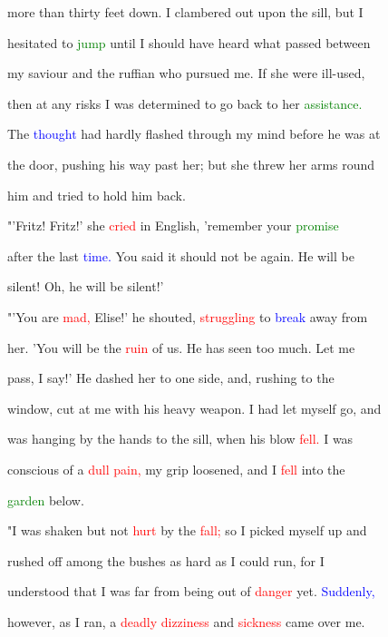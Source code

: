  more than thirty feet down. I clambered out upon the sill, but I

 hesitated to \textcolor{green}{jump} until I should have heard what passed between

 my saviour and the ruffian who pursued me. If she were ill-used,

 then at any \textcolor{BurntOrange}{risks} I was determined to go back to her \textcolor{green}{assistance.}

 The \textcolor{blue}{thought} had hardly flashed through my mind before he was at

 the door, pushing his way past her; but she threw her arms round

 him and tried to hold him back.



 "'Fritz! Fritz!' she \textcolor{red}{cried} in English, 'remember your \textcolor{green}{promise}

 after the last \textcolor{blue}{time.} You said it should not be again. He will be

 silent! Oh, he will be silent!'



 "'You are \textcolor{red}{mad,} Elise!' he \textcolor{BurntOrange}{shouted,} \textcolor{red}{struggling} to \textcolor{blue}{break} away from

 her. 'You will be the \textcolor{red}{ruin} of us. He has seen too much. Let me

 pass, I say!' He dashed her to one side, and, rushing to the

 window, cut at me with his heavy weapon. I had let myself go, and

 was hanging by the hands to the sill, when his blow \textcolor{red}{fell.} I was

 conscious of a \textcolor{red}{dull} \textcolor{red}{pain,} my grip loosened, and I \textcolor{red}{fell} into the

 \textcolor{green}{garden} below.



 "I was shaken but not \textcolor{red}{hurt} by the \textcolor{red}{fall;} so I picked myself up and

 rushed off among the bushes as hard as I could run, for I

 understood that I was far from being out of \textcolor{red}{danger} yet. \textcolor{blue}{Suddenly,}

 however, as I ran, a \textcolor{red}{deadly} \textcolor{red}{dizziness} and \textcolor{red}{sickness} came over me.

